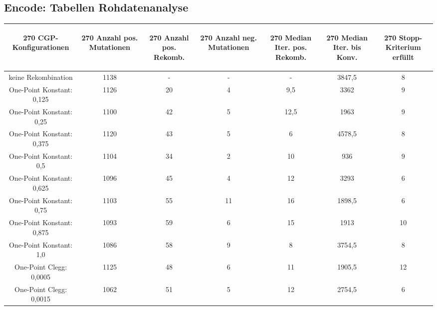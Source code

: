 \subsection{Encode: Tabellen Rohdatenanalyse}
\label{subsec:appendix:TabellenReohdatenanalyseEncode}
\begin{table}[H]
	\centering
	\begin{tabular}{c | c | c | c | c | c | c}
		\begin{turn}{270} \textbf{CGP-Konfigurationen} \end{turn} & \begin{turn}{270} \textbf{Anzahl pos. Mutationen} \end{turn} & \begin{turn}{270} \textbf{Anzahl pos. Rekomb.} \end{turn} & \begin{turn}{270} \textbf{Anzahl neg. Mutationen} \end{turn} & \begin{turn}{270} \textbf{Median Iter. pos. Rekomb.} \end{turn} & \begin{turn}{270} \textbf{Median Iter. bis Konv.} \end{turn} & \begin{turn}{270} \textbf{Stopp-Kriterium erfüllt} \end{turn}\\
		\hline
		keine Rekombination & 1138 & - & - & - & 3847,5 & 8\\
		\hline
		\hline
		One-Point Konstant: 0,125 & 1126 & 20 & 4 & 9,5 & 3362 & 9\\
		\hline
		One-Point Konstant: 0,25 & 1100 & 42 & 5 & 12,5 & 1963 & 9\\
		\hline
		One-Point Konstant: 0,375 & 1120 & 43 & 5 & 6 & 4578,5 & 8\\
		\hline
		One-Point Konstant: 0,5 & 1104 & 34 & 2 & 10 & 936 & 9\\
		\hline
		One-Point Konstant: 0,625 & 1096 & 45 & 4 & 12 & 3293 & 6\\
		\hline
		One-Point Konstant: 0,75 & 1103 & 55 & 11 & 16 & 1898,5 & 6\\
		\hline
		One-Point Konstant: 0,875 & 1093 & 59 & 6 & 15 & 1913 & 10\\
		\hline
		One-Point Konstant: 1,0 & 1086 & 58 & 9 & 8 & 3754,5 & 8\\
		\hline
		\hline
		One-Point Clegg: 0,0005 & 1125 & 48 & 6 & 11 & 1905,5 & 12\\
		\hline
		One-Point Clegg: 0,0015 & 1062 & 51 & 5 & 12 & 2754,5 & 6\\

\end{tabular}
\end{table}

